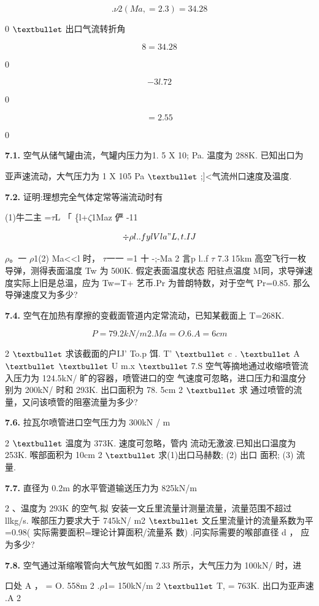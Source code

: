 \[.\nu 2 (Ma , = 2. 3) = 34. 28\]

0 ${\rm •}$ 出口气流转折角

\[8=34. 28\]

0

\[-3l. 72\]

0

\[=2. 55\]

0

\noindent\textbf{7.1.} 空气从储气罐由流，气罐内压力为1. 5 X 10; Pa. 温度为 288K. 已知出口为

亚声速流动，大气压力为 1 X 105 Pa ${\rm •}$ ;]<气流州口速度及温度.

\noindent\textbf{7.2.} 证明:理想完全气体定常等湍流动时有

(1)牛二主 =$\tau$L 「 \{l+$\zeta$1Maz 俨 -11

\[\div \rho  l..f ylVl a" L , t. I J\]

$\rho$。一 $\rho$1(2) Ma<<l 时， $\tau$一一 =1 十 -;-Ma 2 言p l..f $\tau$ 7.3 15km 高空飞行一枚导弹，测得表面温度 Tw 为 500K. 假定表面温度状态 阳驻点温度 M同，求导弹速度实际上旧是总温，应为 Tw=T+ 艺币.Pr 为普朗特数，对于空气 Pr=0.85. 那么导弹速度又为多少?

\noindent\textbf{7.4.} 空气在加热有摩擦的变截面管道内定常流动，已知某截面上 T=268K.

\[P=79. 2kN/m 2 .Ma=O. 6.A=6cm\]

2 ${\rm •}$ 求该截面的户IJ' To.p 饵. T' ${\rm •}$ c . ${\rm •}$ A ${\rm •}$ ${\rm •}$ U m.x ${\rm •}$ 7.S 空气等摘地通过收缩喷管流入压力为 124.5kN/ 旷的容器，喷管进口的空 气速度可忽略，进口压力和温度分别为 200kN/ 时和 293K. 出口面积为 78. 5cm 2 ${\rm •}$ 求 通过喷管的流量，又问该喷管的阻塞流量为多少?

\noindent\textbf{7.6.} 拉瓦尔喷管进口空气压力为 300kN / m

2 ${\rm •}$ 温度为 373K. 速度可忽略，管内 流动无激波.已知出口温度为 253K. 喉部面积为 10cm 2 ${\rm •}$ 求(1)出口马赫数; (2) 出口 面积; (3) 流量.

\noindent\textbf{7.7.} 直径为 0.2m 的水平管道输送压力为 825kN/m

2 、温度为 293K 的空气.拟 安装一文丘里流量计测量流量，流量范围不超过 llkg/s. 喉部压力要求大于 745kN/ m2 ${\rm •}$ 文丘里流量计的流量系数为平 =0.98( 实际需要面积=理论计算面积/流量系 数) .问实际需要的喉部直径 d ， 应为多少?

\noindent\textbf{7.8.} 空气通过渐缩喉管向大气放气如图 7.33 所示，大气压力为 100kN/ 时，进

口处 A ， = O. 558m 2 .$\rho$1= 150kN/m 2 ${\rm •}$ T, = 763K. 出口为亚声速 .A 2

